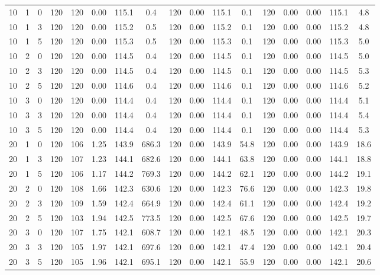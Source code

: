\documentclass[3p, authoryear, 11pt]{elsarticle}
\begin{document}
\begin{table}[H]
\begin{tabular}{cccc cccc cccc ccccc}
    10 & 1 & 0 & 120 & 120 & 0.00 & 115.1 & 0.4 & 120 & 0.00 & 115.1 & 0.1 & 120 & 0.00 & 0.00 & 115.1 & 4.8 \\
    10 & 1 & 3 & 120 & 120 & 0.00 & 115.2 & 0.5 & 120 & 0.00 & 115.2 & 0.1 & 120 & 0.00 & 0.00 & 115.2 & 4.8 \\
    10 & 1 & 5 & 120 & 120 & 0.00 & 115.3 & 0.5 & 120 & 0.00 & 115.3 & 0.1 & 120 & 0.00 & 0.00 & 115.3 & 5.0 \\
    \cmidrule{1-17}
    10 & 2 & 0 & 120 & 120 & 0.00 & 114.5 & 0.4 & 120 & 0.00 & 114.5 & 0.1 & 120 & 0.00 & 0.00 & 114.5 & 5.0 \\
    10 & 2 & 3 & 120 & 120 & 0.00 & 114.5 & 0.4 & 120 & 0.00 & 114.5 & 0.1 & 120 & 0.00 & 0.00 & 114.5 & 5.3 \\
    10 & 2 & 5 & 120 & 120 & 0.00 & 114.6 & 0.4 & 120 & 0.00 & 114.6 & 0.1 & 120 & 0.00 & 0.00 & 114.6 & 5.2 \\
    \cmidrule{1-17}
    10 & 3 & 0 & 120 & 120 & 0.00 & 114.4 & 0.4 & 120 & 0.00 & 114.4 & 0.1 & 120 & 0.00 & 0.00 & 114.4 & 5.1 \\
    10 & 3 & 3 & 120 & 120 & 0.00 & 114.4 & 0.4 & 120 & 0.00 & 114.4 & 0.1 & 120 & 0.00 & 0.00 & 114.4 & 5.4 \\
    10 & 3 & 5 & 120 & 120 & 0.00 & 114.4 & 0.4 & 120 & 0.00 & 114.4 & 0.1 & 120 & 0.00 & 0.00 & 114.4 & 5.3 \\
    \midrule
    20 & 1 & 0 & 120 & 106 & 1.25 & 143.9 & 686.3 & 120 & 0.00 & 143.9 & 54.8 & 120 & 0.00 & 0.00 & 143.9 & 18.6 \\
    20 & 1 & 3 & 120 & 107 & 1.23 & 144.1 & 682.6 & 120 & 0.00 & 144.1 & 63.8 & 120 & 0.00 & 0.00 & 144.1 & 18.8 \\
    20 & 1 & 5 & 120 & 106 & 1.17 & 144.2 & 769.3 & 120 & 0.00 & 144.2 & 62.1 & 120 & 0.00 & 0.00 & 144.2 & 19.1 \\
    \cmidrule{1-17}
    20 & 2 & 0 & 120 & 108 & 1.66 & 142.3 & 630.6 & 120 & 0.00 & 142.3 & 76.6 & 120 & 0.00 & 0.00 & 142.3 & 19.8 \\
    20 & 2 & 3 & 120 & 109 & 1.59 & 142.4 & 664.9 & 120 & 0.00 & 142.4 & 61.1 & 120 & 0.00 & 0.00 & 142.4 & 19.2 \\
    20 & 2 & 5 & 120 & 103 & 1.94 & 142.5 & 773.5 & 120 & 0.00 & 142.5 & 67.6 & 120 & 0.00 & 0.00 & 142.5 & 19.7 \\
    \cmidrule{1-17}
    20 & 3 & 0 & 120 & 107 & 1.75 & 142.1 & 608.7 & 120 & 0.00 & 142.1 & 48.5 & 120 & 0.00 & 0.00 & 142.1 & 20.3 \\
    20 & 3 & 3 & 120 & 105 & 1.97 & 142.1 & 697.6 & 120 & 0.00 & 142.1 & 47.4 & 120 & 0.00 & 0.00 & 142.1 & 20.4 \\
    20 & 3 & 5 & 120 & 105 & 1.96 & 142.1 & 695.1 & 120 & 0.00 & 142.1 & 55.9 & 120 & 0.00 & 0.00 & 142.1 & 20.6 \\
    \midrule



\end{tabular}
\end{table}
\end{document}
